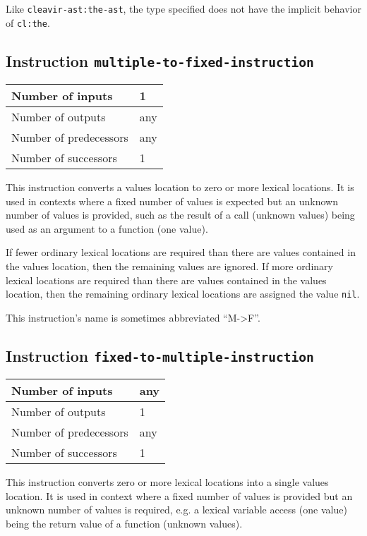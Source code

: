 Like \texttt{cleavir-ast:the-ast}, the type specified does not have
the implicit \rest behavior of \texttt{cl:the}.

\subsection{Instruction \texttt{multiple-to-fixed-instruction}}
\label{mir-instruction-multiple-to-fixed}

\begin{tabular}{|l|l|}
  \hline
  Number of inputs & 1\\
  \hline
  Number of outputs & any\\
  \hline
  Number of predecessors & any\\
  \hline
  Number of successors & 1\\
  \hline
\end{tabular}

This instruction converts a values location to zero or more lexical
locations. It is used in contexts where a fixed number of values is
expected but an unknown number of values is provided, such as the
result of a call (unknown values) being used as an argument to a
function (one value).

If fewer ordinary lexical locations are required than there are values
contained in the values location, then the remaining values are
ignored. If more ordinary lexical locations are required than there
are values contained in the values location, then the remaining
ordinary lexical locations are assigned the value \texttt{nil}.

This instruction's name is sometimes abbreviated ``M->F''.

\subsection{Instruction \texttt{fixed-to-multiple-instruction}}
\label{mir-instruction-fixed-to-multiple}

\begin{tabular}{|l|l|}
  \hline
  Number of inputs & any\\
  \hline
  Number of outputs & 1\\
  \hline
  Number of predecessors & any\\
  \hline
  Number of successors & 1\\
  \hline
\end{tabular}

This instruction converts zero or more lexical locations into a single
values location. It is used in context where a fixed number of values
is provided but an unknown number of values is required, e.g. a
lexical variable access (one value) being the return value of a
function (unknown values).

